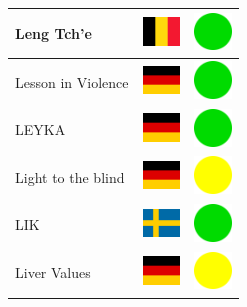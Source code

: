 \documentclass[12pt, a4paper, twoside]{report}
\begin{document}
\begin{center}
\begin{longtable}{|p{5cm}|p{2cm}|p{2cm}|}
Leng Tch'e & \includegraphics[width=1cm]{4x3/be} & \includegraphics[width=1cm]{likes/y} \\ \hline
Lesson in Violence & \includegraphics[width=1cm]{4x3/de} & \includegraphics[width=1cm]{likes/y} \\ \hline
LEYKA & \includegraphics[width=1cm]{4x3/de} & \includegraphics[width=1cm]{likes/y} \\ \hline
Light to the blind & \includegraphics[width=1cm]{4x3/de} & \includegraphics[width=1cm]{likes/m} \\ \hline
LIK & \includegraphics[width=1cm]{4x3/se} & \includegraphics[width=1cm]{likes/y} \\ \hline
Liver Values & \includegraphics[width=1cm]{4x3/de} & \includegraphics[width=1cm]{likes/m} \\ \hline

\end{longtable}
\end{center}
\end{document}
